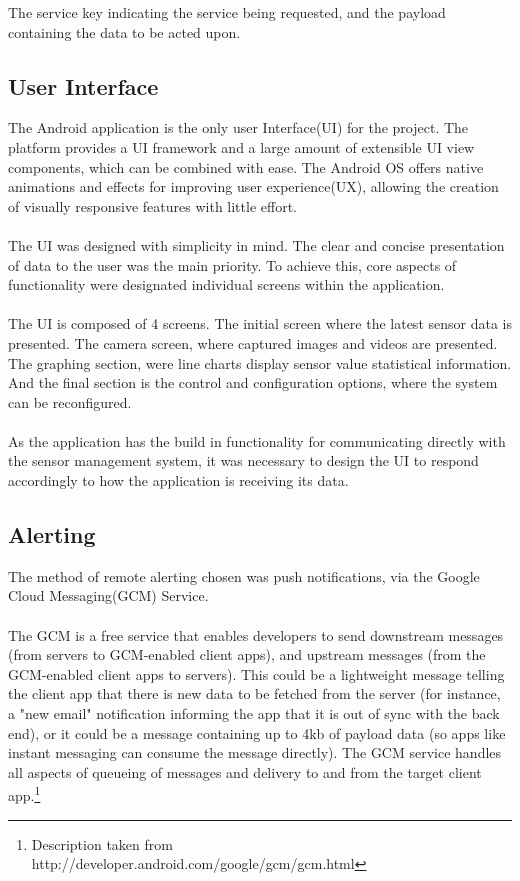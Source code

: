 \documentclass{article}
\begin{document}
\noindent
The service key indicating the service being requested, and the payload containing the data to be acted upon.

\subsection{User Interface}
The Android application is the only user Interface(UI) for the project. The platform provides a UI framework and a large amount of extensible UI view components, which can be combined with ease. The Android OS offers native animations and effects for improving user experience(UX), allowing the creation of visually responsive features with little effort. \\\\ The UI was designed with simplicity in mind. The clear and concise presentation of data to the user was the main priority. To achieve this, core aspects of functionality were designated individual screens within the application. \\\\ The UI is composed of 4 screens. The initial screen where the latest sensor data is presented. The camera screen, where captured images and videos are presented. The graphing section, were line charts display sensor value statistical information. And the final section is the control and configuration options, where the system can be reconfigured. \\\\ As the application has the build in functionality for communicating directly with the sensor management system, it was necessary to design the UI to respond accordingly to how the application is receiving its data.

\subsection{Alerting}
The method of remote alerting chosen was push notifications, via the Google Cloud Messaging(GCM) Service. \\\\ 
The GCM is a free service that enables developers to send downstream messages (from servers to GCM-enabled client apps), and upstream messages (from the GCM-enabled client apps to servers). This could be a lightweight message telling the client app that there is new data to be fetched from the server (for instance, a "new email" notification informing the app that it is out of sync with the back end), or it could be a message containing up to 4kb of payload data (so apps like instant messaging can consume the message directly). The GCM service handles all aspects of queueing of messages and delivery to and from the target client app.\footnote{Description taken from http://developer.android.com/google/gcm/gcm.html}
\end{document}
